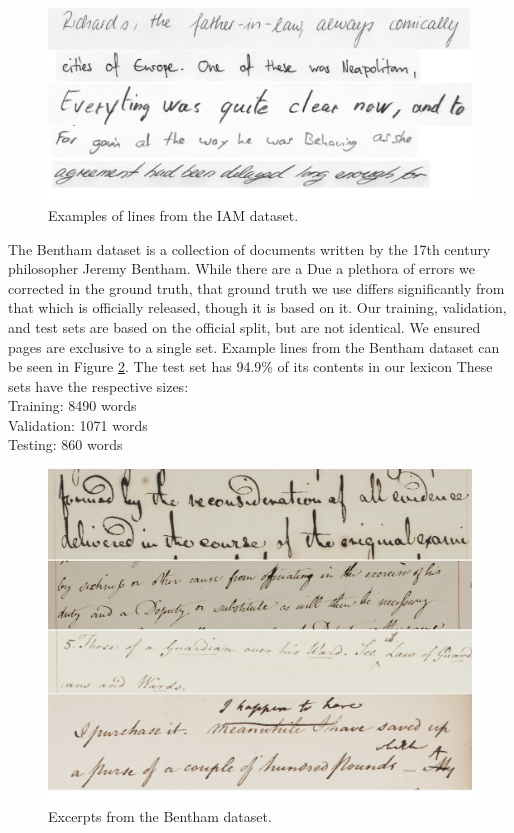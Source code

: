 \documentclass[ms,electronic,twosidetoc,letterpaper,chaptercenter,parttop,lol,lof,lot]{byumsphd}
\begin{document}
\begin{figure}
    \centering
    \includegraphics[width=.9\textwidth]{IAM_examples}
    \caption{Examples of lines from the IAM dataset.}
    \label{fig:IAMExamples}
\end{figure}


The Bentham dataset \cite{bentham} is a collection of documents written by the 17th century philosopher Jeremy Bentham. While there are a  Due a plethora of errors we corrected in the ground truth, that ground truth we use differs significantly from that which is officially released, though it is based on it. Our training, validation, and test sets are based on the official split, but are not identical. We ensured pages are exclusive to a single set.
Example lines from the Bentham dataset can be seen in Figure \ref{fig:BenthamExamples}.
The test set has 94.9\% of its contents in our lexicon
These sets have the respective sizes:\\
\indent \indent Training: 8490 words\\
\indent \indent Validation: 1071 words\\
\indent \indent Testing: 860 words

\begin{figure}
    \centering
    \includegraphics[width=.9\textwidth]{bentham_examples}
    \caption{Excerpts from the Bentham dataset.}
    \label{fig:BenthamExamples}
\end{figure}
\end{document}
